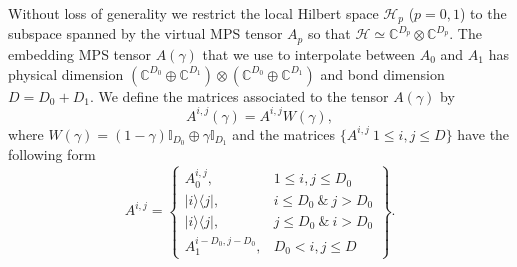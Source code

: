\documentclass[a4paper,twocolumn,11pt,accepted=2023-02-10]{quantumarticle}
\newcommand{\id}{\mathbb{I}}
\begin{document}
Without loss of generality we restrict the local Hilbert space $\mathcal{H}_p$ ($p=0,1$) to the subspace spanned by the virtual MPS tensor $A_p$ so that $\mathcal{H} \simeq\mathbb{C}^{D_p} \otimes \mathbb{C}^{D_p}$. The embedding MPS tensor $A(\gamma)$ that we use to interpolate between $A_0$ and $A_1$ has physical dimension $(\mathbb{C}^{D_0} \oplus  \mathbb{C}^{D_1}) \otimes (\mathbb{C}^{D_0} \oplus  \mathbb{C}^{D_1})$
and bond dimension $D = D_0+D_1$. We define the matrices associated to the tensor $A(\gamma)$ by
\begin{equation}\label{defAgamma}
 A^{i,j}(\gamma)= A^{i,j}  W(\gamma) , 
\end{equation}
where  $W(\gamma) = (1-\gamma)\id_{D_0}\oplus \gamma\id_{D_1}$ and the matrices $\{ A^{i,j}\  1\leq i,j \leq D \}$ have the following form
\begin{equation*}
A^{i,j} = \left\{
    \begin{array}{cc}
        A_0^{i,j}, &  1 \leq i,j \leq D_0 \\
        |i\rangle \langle j |, &   i\leq D_0 \ \& \  j > D_0 \\
        |i\rangle \langle j |, &   j\leq D_0 \ \& \ i > D_0 \\
         A_1^{i-D_0,j-D_0}, &  D_0 < i,j \leq D
    \end{array} \right\} . 
\end{equation*}
\end{document}
